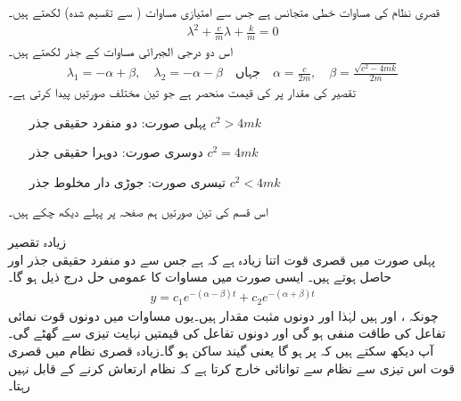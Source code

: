 قصری نظام کی مساوات خطی متجانس ہے جس سے  امتیازی مساوات ( سے تقسیم شدہ) لکھتے ہیں۔
\begin{align*}
\lambda^2+\frac{c}{m}\lambda+\frac{k}{m}=0
\end{align*}
اس دو درجی الجبرائی مساوات کے جذر لکھتے ہیں۔
\begin{align}\label{مساوات_سادہ_دو_درجی_تقصیری_مستقل}
\lambda_1=-\alpha+\beta, \quad \lambda_2=-\alpha-\beta \quad \text{جہاں} \quad \alpha=\frac{c}{2m}, \quad \beta=\frac{\sqrt{c^2-4mk}}{2m}
\end{align}
تقصیر کی مقدار پر  کی قیمت منحصر ہے جو تین مختلف صورتیں پیدا کرتی ہے۔
 \begin{itemize}
\item[پہلی صورت:]
  دو منفرد حقیقی جذر \quad $c^2>4mk$
\item[دوسری صورت:]
  دوہرا حقیقی جذر \quad $c^2=4mk$
\item[تیسری صورت:]
  جوڑی دار مخلوط جذر \quad $c^2<4mk$ 
\end{itemize}
اس قسم کی تین صورتیں ہم  صفحہ  پر پہلے دیکھ چکے ہیں۔

\quad زیادہ تقصیر\\
پہلی صورت میں قصری قوت اتنا زیادہ ہے کہ  ہے جس سے دو منفرد حقیقی جذر  اور  حاصل ہوتے ہیں۔ ایسی صورت میں مساوات  کا عمومی حل درج ذیل ہو گا۔
\begin{align}\label{مساوات_سادہ_دو_درجی_قصری_زیادہ_حل_الف}
y=c_1 e^{-(\alpha-\beta)t}+c_2e^{-(\alpha+\beta)t}
\end{align}
چونکہ ،  اور  ہیں لہٰذا  اور  دونوں مثبت مقدار ہیں۔یوں  مساوات  میں دونوں قوت نمائی تفاعل کی طاقت منفی ہو گی اور دونوں تفاعل کی قیمتیں نہایت تیزی سے گھٹے گی۔آپ دیکھ سکتے ہیں کہ  پر  ہو گا یعنی گیند ساکن ہو گا۔زیادہ قصری نظام میں قصری قوت اس تیزی سے نظام سے توانائی خارج کرتا ہے کہ نظام ارتعاش کرنے کے قابل نہیں رہتا۔

